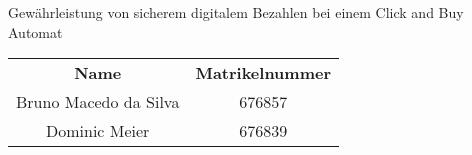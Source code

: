 \begin{titlepage}
    \vspace*{7cm}
    \begin{center}
        \Huge
        Gewährleistung von sicherem digitalem Bezahlen bei einem Click and Buy Automat\\
        \vspace{1cm}
        \large
        \vspace{2cm}
         \begin {table}[ht]
             \centering
             \begin{tabular}{c|c}
                 \textbf{Name} & \textbf{Matrikelnummer} \\
                 Bruno Macedo da Silva & 676857 \\
                 Dominic Meier         & 676839 \\
             \end{tabular}
         \end {table}
    \end{center}
    \normalsize
    \vfill
 


\end{titlepage}